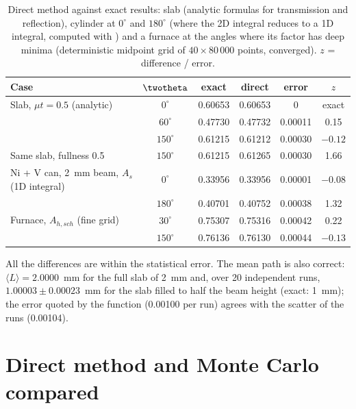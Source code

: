 \begin{table}[H]
  \centering\small
  \begin{tabular}{@{}>{\raggedright\arraybackslash}p{6.2cm}ccccc@{}}
    \toprule \textbf{Case} & $\twotheta$ & \textbf{exact} & \textbf{direct} & \textbf{error} & $z$ \\ \midrule
    Slab, $\mu t=0.5$ (analytic) & $0^\circ$   & 0.60653 & 0.60653 & 0       & exact \\
                                                   & $60^\circ$  & 0.47730 & 0.47732 & 0.00011 & 0.15 \\
                                                   & $150^\circ$ & 0.61215 & 0.61212 & 0.00030 & $-0.12$ \\
    Same slab, fullness 0.5                        & $150^\circ$ & 0.61215 & 0.61265 & 0.00030 & 1.66 \\
    Ni + V can, 2~mm beam, $A_s$ (1D integral) & $0^\circ$ & 0.33956 & 0.33956 & 0.00001 & $-0.08$ \\
                                                   & $180^\circ$ & 0.40701 & 0.40752 & 0.00038 & 1.32 \\
    Furnace, $A_{h,sch}$ (fine grid) & $30^\circ$  & 0.75307 & 0.75316 & 0.00042 & 0.22 \\
                                                   & $150^\circ$ & 0.76136 & 0.76130 & 0.00044 & $-0.13$ \\ \bottomrule
  \end{tabular}
  \caption{Direct method against exact results: slab (analytic formulas for transmission and reflection), cylinder at $0^\circ$ and $180^\circ$
  (where the 2D integral reduces to a 1D integral, computed with ) and a furnace at the angles where its factor has deep
  minima (deterministic midpoint grid of $40\times80\,000$ points, converged). $z$ = difference / error.}
  \label{tab:direct-exact}
\end{table}

All the differences are within the statistical error. The mean path is also correct: $\langle L\rangle=2.0000$~mm for the full slab of 2~mm and,
over 20 independent runs, $1.00003\pm0.00023$~mm for the slab filled to half the beam height (exact: 1~mm); the error quoted by the function
(0.00100 per run) agrees with the scatter of the runs (0.00104).

\section{Direct method and Monte Carlo compared}
\label{sec:direct-efficiency}

